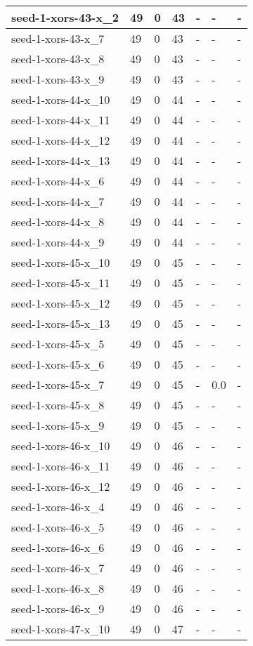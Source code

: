 \begin{scriptsize}
\begin{longtable}{|p{5cm}|l|l|l|l|l|l|}
seed-1-xors-43-x\_2&49&0&43&-&-&- \\ \hline 
seed-1-xors-43-x\_7&49&0&43&-&-&- \\ \hline 
seed-1-xors-43-x\_8&49&0&43&-&-&- \\ \hline 
seed-1-xors-43-x\_9&49&0&43&-&-&- \\ \hline 
seed-1-xors-44-x\_10&49&0&44&-&-&- \\ \hline 
seed-1-xors-44-x\_11&49&0&44&-&-&- \\ \hline 
seed-1-xors-44-x\_12&49&0&44&-&-&- \\ \hline 
seed-1-xors-44-x\_13&49&0&44&-&-&- \\ \hline 
seed-1-xors-44-x\_6&49&0&44&-&-&- \\ \hline 
seed-1-xors-44-x\_7&49&0&44&-&-&- \\ \hline 
seed-1-xors-44-x\_8&49&0&44&-&-&- \\ \hline 
seed-1-xors-44-x\_9&49&0&44&-&-&- \\ \hline 
seed-1-xors-45-x\_10&49&0&45&-&-&- \\ \hline 
seed-1-xors-45-x\_11&49&0&45&-&-&- \\ \hline 
seed-1-xors-45-x\_12&49&0&45&-&-&- \\ \hline 
seed-1-xors-45-x\_13&49&0&45&-&-&- \\ \hline 
seed-1-xors-45-x\_5&49&0&45&-&-&- \\ \hline 
seed-1-xors-45-x\_6&49&0&45&-&-&- \\ \hline 
seed-1-xors-45-x\_7&49&0&45&-&0.0&- \\ \hline 
seed-1-xors-45-x\_8&49&0&45&-&-&- \\ \hline 
seed-1-xors-45-x\_9&49&0&45&-&-&- \\ \hline 
seed-1-xors-46-x\_10&49&0&46&-&-&- \\ \hline 
seed-1-xors-46-x\_11&49&0&46&-&-&- \\ \hline 
seed-1-xors-46-x\_12&49&0&46&-&-&- \\ \hline 
seed-1-xors-46-x\_4&49&0&46&-&-&- \\ \hline 
seed-1-xors-46-x\_5&49&0&46&-&-&- \\ \hline 
seed-1-xors-46-x\_6&49&0&46&-&-&- \\ \hline 
seed-1-xors-46-x\_7&49&0&46&-&-&- \\ \hline 
seed-1-xors-46-x\_8&49&0&46&-&-&- \\ \hline 
seed-1-xors-46-x\_9&49&0&46&-&-&- \\ \hline 
seed-1-xors-47-x\_10&49&0&47&-&-&- \\ \hline 

\end{longtable}
\end{scriptsize}
